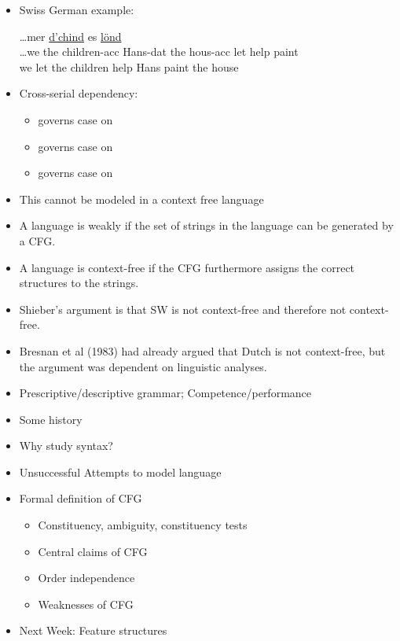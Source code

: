 \documentclass[a4paper,landscape,headrule,footrule]{foils}
\begin{document}
\begin{itemize}
\item Swiss German example:
  \begin{exe}
    \ex \gll \ldots mer \uline{d’chind}  es  \uline{l\"ond}  \\
    \ldots we {the children-acc} Hans-dat the hous-acc let help paint \\
    \trans we let {the children} help Hans paint the house 
  \end{exe}
\item Cross-serial dependency:
\begin{itemize}
\item {} governs case on 
\item {} governs case on 
\item {} governs case on 
\end{itemize}
\item This cannot be modeled in a context free language
\end{itemize}

\begin{itemize}
\item A language is weakly  if the set of
strings in the language can be generated by a CFG.
\item A language is  context-free if the CFG
furthermore assigns the correct structures to the
strings.
\item Shieber’s argument is that SW is not 
context-free and therefore not  context-free.
\item Bresnan et al (1983) had already argued that Dutch
is  not context-free, but the argument was
dependent on linguistic analyses.
\end{itemize}


\begin{itemize}
\item Prescriptive/descriptive grammar;
Competence/performance
\item Some history
\item Why study syntax?
\item Unsuccessful Attempts to model language
\item Formal definition of CFG
  \begin{itemize}
  \item Constituency, ambiguity, constituency tests
  \item Central claims of CFG
  \item Order independence
  \item Weaknesses of CFG
  \end{itemize}
\item Next Week: Feature structures
\end{itemize}
\end{document}
